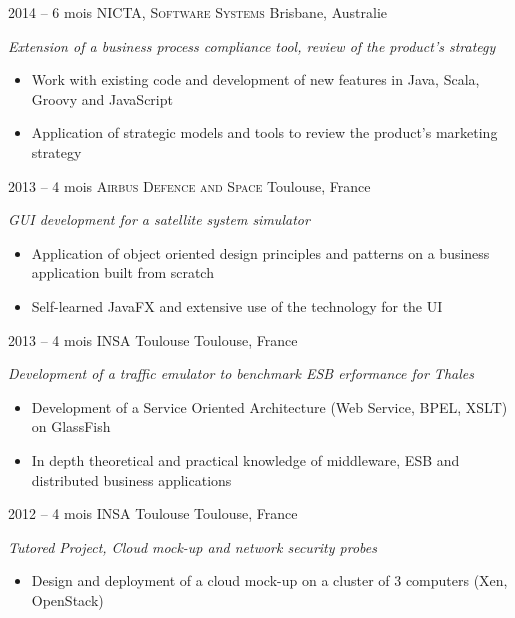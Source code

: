 \documentclass[]{friggeri-cv} %
\begin{document}
\begin{entrylist}
\entry
{2014 -- 6 mois}
{NICTA, \textsc{Software Systems}}
{Brisbane, Australie}
{\emph{Extension of a business process compliance tool, review of the product's strategy }
\begin{itemize}
\item Work with existing code and development of new features in Java, Scala, Groovy and JavaScript
\item Application of strategic models and tools to review the product's marketing strategy
\end{itemize}
}

\entry
{2013 -- 4 mois}
{\textsc{Airbus Defence and Space}}
{Toulouse, France}
{\emph{GUI development for a satellite system simulator}
\begin{itemize}
\item Application of object oriented design principles and patterns on a business application built from scratch
\item Self-learned JavaFX and extensive use of the technology for the UI
\end{itemize}
}
\entry
{2013 -- 4 mois}
{INSA Toulouse}
{Toulouse, France}
{\emph{Development of a traffic emulator to benchmark ESB erformance for Thales}
\begin{itemize}
\item Development of a Service Oriented Architecture (Web Service, BPEL, XSLT) on GlassFish
\item In depth theoretical and practical knowledge of middleware, ESB and distributed business applications
\end{itemize}}
\entry
{2012 -- 4 mois}
{INSA Toulouse}
{Toulouse, France}
{\emph{Tutored Project, Cloud mock-up and network security probes}
\begin{itemize}
\item Design and deployment of a cloud mock-up on a cluster of 3 computers (Xen, OpenStack)

\end{itemize}}
\end{entrylist}
\end{document}
